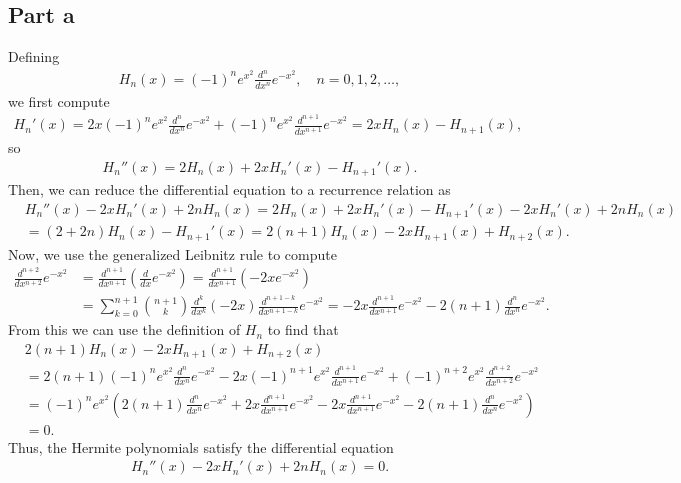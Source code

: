 \documentclass{article}
\begin{document}
\subsection{Part a}
Defining \begin{align*}
      H_n(x) = (-1)^n e^{x^2} \frac{d^n}{d x^n} e^{-x^2}, \quad n = 0,1,2,\ldots,
    \end{align*}
we first compute 
\begin{align*}
H_n'(x)=2x(-1)^ne^{x^2}\frac{d^n}{d x^n} e^{-x^2}+(-1)^ne^{x^2}\frac{d^{n+1}}{d x^{n+1}} e^{-x^2}=2xH_n(x)-H_{n+1}(x),
\end{align*}
so
\begin{align*}
H_n''(x)=2H_n(x)+2xH_n'(x)-H_{n+1}'(x).
\end{align*}
Then, we can reduce the differential equation to a recurrence relation as
\begin{align*}
&H_n''(x) - 2 x H_n'(x) + 2 n H_n(x)=2H_n(x)+2xH_n'(x)-H_{n+1}'(x)- 2 x H_n'(x)+ 2 n H_n(x)\\&=
(2+2n)H_n(x)-H_{n+1}'(x)=2(n+1)H_n(x)-2xH_{n+1}(x)+H_{n+2}(x).
\end{align*}
Now, we use the generalized Leibnitz rule to compute
\begin{align*}
\frac{d^{n+2}}{d x^{n+2}} e^{-x^2}&=\frac{d^{n+1}}{d x^{n+1}} \left(\frac{d}{dx}e^{-x^2}\right)=\frac{d^{n+1}}{d x^{n+1}}(-2xe^{-x^2})\\&=
\sum_{k=0}^{n+1}\binom{n+1}{k}\frac{d^k}{dx^k}(-2x)\frac{d^{n+1-k}}{d x^{n+1-k}}e^{-x^2}=-2x\frac{d^{n+1}}{d x^{n+1}}e^{-x^2}-2(n+1)\frac{d^{n}}{d x^{n}}e^{-x^2}.
\end{align*}
From this we can use the definition of $H_n$ to find that 
\begin{align*}
&2(n+1)H_n(x)-2xH_{n+1}(x)+H_{n+2}(x)\\&=
2(n+1)(-1)^n e^{x^2} \frac{d^n}{d x^n} e^{-x^2}-2x(-1)^{n+1} e^{x^2} \frac{d^{n+1}}{d x^{n+1}} e^{-x^2}+(-1)^{n+2} e^{x^2} \frac{d^{n+2}}{d x^{n+2}} e^{-x^2}\\&=
(-1)^n e^{x^2}\left(2(n+1)\frac{d^n}{d x^n} e^{-x^2}+2x\frac{d^{n+1}}{d x^{n+1}} e^{-x^2}-2x\frac{d^{n+1}}{d x^{n+1}}e^{-x^2}-2(n+1)\frac{d^{n}}{d x^{n}}e^{-x^2}\right)\\&=
0.
\end{align*}
Thus, the Hermite polynomials satisfy the differential equation
\begin{align*}
      H_n''(x) - 2 x H_n'(x) + 2 n H_n(x) = 0.
    \end{align*}
\end{document}
